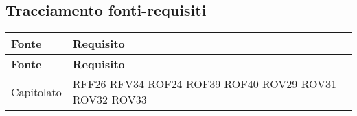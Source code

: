 \subsection{Tracciamento fonti-requisiti}
\def\arraystretch{1.5}
\begin{longtable}{p{2.5cm}!{\VRule[1pt]}p{2.5cm}}
	\color{white} \textbf{Fonte} & \color{white} \textbf{Requisito} \\ 
	\endfirsthead 
	\color{white} \textbf{Fonte} & \color{white} \textbf{Requisito} \\ 
	\endhead 
	Capitolato & RFF26 \newline RFV34 \newline ROF24 \newline ROF39 \newline ROF40 \newline ROV29 \newline ROV31 \newline ROV32 \newline ROV33\\

\end{longtable}
